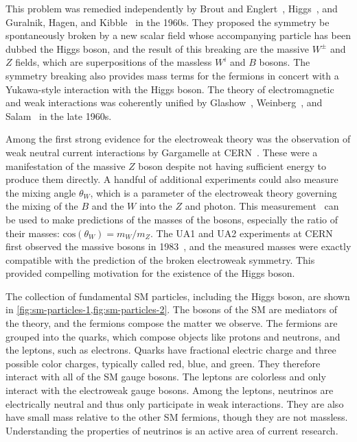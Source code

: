 This problem was remedied independently by Brout and Englert~\cite{1964.Englert.symmetry_breaking}, Higgs~\cite{1964.Higgs.Broken_Symmetries_1,1964.Higgs.Broken_Symmetries_2}, and Guralnik, Hagen, and Kibble~\cite{1964.Guralnik-Hagen-Kibble.symmetry_breaking} in the 1960s. They proposed the symmetry be spontaneously broken by a new scalar field whose accompanying particle has been dubbed the Higgs boson, and the result of this breaking are the massive $W^\pm$ and $Z$ fields, which are superpositions of the massless $W^i$ and $B$ bosons. The symmetry breaking also provides mass terms for the fermions in concert with a Yukawa-style interaction with the Higgs boson. The theory of electromagnetic and weak interactions was coherently unified by Glashow~\cite{1961.Glashow.Partial-symmetries}, Weinberg~\cite{1967.Weinberg.A_model_of_leptons}, and Salam~\cite{1968.Salam.weak-and-EM} in the late 1960s.

Among the first strong evidence for the electroweak theory was the observation of weak neutral current interactions by Gargamelle at CERN~\cite{1973.gargamelle-1,1973.gargamelle-2,1973.gargamelle-3}. These were a manifestation of the massive $Z$ boson despite not having sufficient energy to produce them directly. A handful of additional experiments could also measure the mixing angle $\theta_W$, which is a parameter of the electroweak theory governing the mixing of the $B$ and the $W$ into the $Z$ and photon. This measurement~\cite{1981.weinberg-angle-1,1981.weinberg-angle-2} can be used to make predictions of the masses of the bosons, especially the ratio of their masses: $\text{cos}(\theta_W) = m_W/m_Z$. The UA1 and UA2 experiments at CERN first observed the massive bosons in 1983~\cite{1983.UA1.discovery-of-W,1983.UA1.discovery-of-Z,1983.UA2.discovery-of-W,1983.UA2.discovery-of-Z}, and the measured masses were exactly compatible with the prediction of the broken electroweak symmetry. This provided compelling motivation for the existence of the Higgs boson.

The collection of fundamental SM particles, including the Higgs boson, are shown in \cref{fig:sm-particles-1,fig:sm-particles-2}. The bosons of the SM are mediators of the theory, and the fermions compose the matter we observe. The fermions are grouped into the quarks, which compose objects like protons and neutrons, and the leptons, such as electrons. Quarks have fractional electric charge and three possible color charges, typically called red, blue, and green. They therefore interact with all of the SM gauge bosons. The leptons are colorless and only interact with the electroweak gauge bosons. Among the leptons, neutrinos are electrically neutral and thus only participate in weak interactions. They are also have small mass relative to the other SM fermions, though they are not massless. Understanding the properties of neutrinos is an active area of current research.

